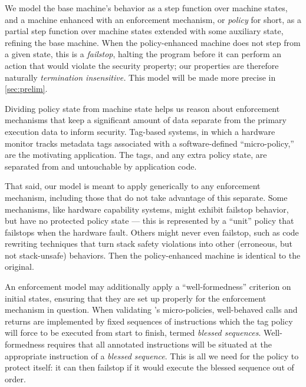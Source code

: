 \documentclass[acmsmall,review,anonymous]{acmart}\settopmatter{printfolios=true,printccs=false,printacmref=false}
\begin{document}
We model the base machine's behavior as a step function over machine states,
and a machine
enhanced with an enforcement mechanism, or {\em policy} for short, as a
partial step function over machine states extended with some
auxiliary state, refining the base machine. When the policy-enhanced machine
does not step from a given state, this is a {\em failstop}, halting the program before it can perform an
action that would violate the security property;
our properties are therefore naturally \emph{termination insensitive.}
This model will be made more precise in \cref{sec:prelim}.

Dividing policy state from machine state helps us reason about
enforcement mechanisms that keep a significant amount of data separate from the
primary execution data to inform security. Tag-based systems, in which a hardware
monitor tracks metadata tags associated with a software-defined ``micro-policy,'' are
the motivating application. The tags, and any extra policy state, are separated from
and untouchable by application code.

That said, our model is meant to apply generically to any enforcement mechanism,
including those that do not take advantage of this separate.
Some mechanisms, like hardware capability systems, might exhibit failstop behavior,
but have no protected policy state --- this is represented by a ``unit'' policy
that failstops when the hardware fault. Others might never even failstop, such as
code rewriting techniques that turn stack safety violations into other (erroneous, but not
stack-unsafe) behaviors. Then the policy-enhanced machine is identical to the original.

An enforcement model may additionally
apply a ``well-formedness'' criterion on initial states, ensuring that
they are set up properly for the enforcement mechanism in question.
When validating \citeauthor{DBLP:conf/sp/RoesslerD18}'s micro-policies,
well-behaved calls and returns are implemented by fixed sequences of instructions
which the tag policy will force to be executed from start to finish,
termed {\em blessed sequences}. Well-formedness requires that all annotated
instructions will be situated at the appropriate instruction of a {\em blessed sequence}.
This is all we need for the policy to protect itself: it can then failstop if it would
execute the blessed sequence out of order.
\end{document}
